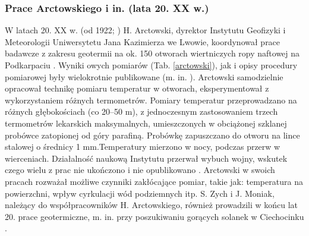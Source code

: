 \documentclass[11.5pt,twoside]{report}
\begin{document}
	
\subsubsection{Prace Arctowskiego i in. (lata 20. XX w.)}

W latach 20. XX w. (od 1922; \cite{Olpinska.1988}) H. Arctowski, dyrektor Instytutu Geofizyki i Meteorologii Uniwersytetu Jana Kazimierza we Lwowie, koordynował prace badawcze z zakresu geotermii na ok. 150 otworach wiertniczych ropy naftowej na Podkarpaciu \parencite{Maj.2010,Olpinska.1988}. Wyniki owych pomiarów (Tab. \ref{arctowski}), jak i opisy procedury pomiarowej były wielokrotnie publikowane (m. in. \cite{Arctowski.1923c,Arctowski.1923b,Arctowski.1923a}). Arctowski samodzielnie opracował technikę pomiaru temperatur w otworach, eksperymentował z wykorzystaniem różnych termometrów. Pomiary temperatur przeprowadzano na różnych głębokościach (co 20--50 m), z jednoczesnym zastosowaniem trzech termometrów lekarskich maksymalnych, umieszczonych w obciążonej szklanej probówce zatopionej od góry parafiną. Probówkę zapuszczano do otworu na lince stalowej o średnicy 1 mm.Temperatury mierzono w nocy, podczas przerw w wierceniach. Działalność naukową Instytutu przerwał wybuch wojny, wskutek czego wielu z prac nie ukończono i nie opublikowano \parencite{Olpinska.1988}. Arctowski w swoich pracach rozważał możliwe czynniki zakłócające pomiar, takie jak: temperatura na powierzchni, wpływ cyrkulacji wód podziemnych itp. S. Zych i J. Moniak, należący do współpracowników H. Arctowskiego, również prowadzili w końcu lat 20. prace geotermiczne, m. in. przy poszukiwaniu gorących solanek w Ciechocinku \parencite{Maj.2010}.

\end{document}
